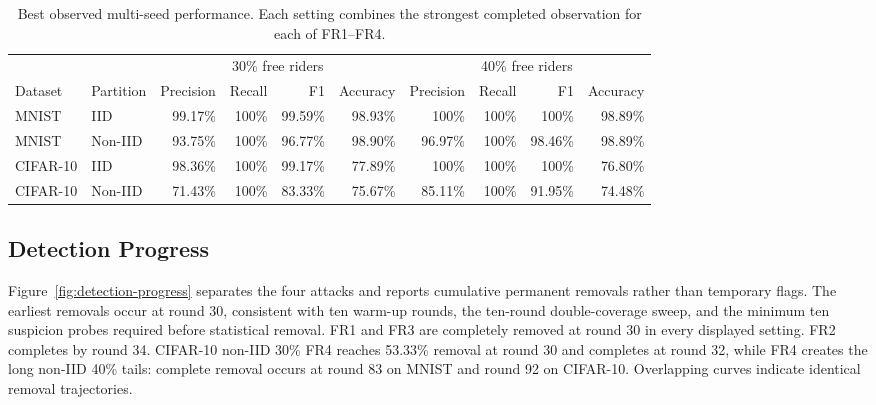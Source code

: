\documentclass[conference]{IEEEtran}
\begin{document}
\begin{table}[t]
\centering
\caption{Best observed multi-seed performance. Each setting combines the strongest completed observation for each of FR1--FR4.}
\label{tab:aggregate}
\setlength{\tabcolsep}{3.5pt}
\begin{tabular}{llrrrrrrrr}
\toprule
& & \multicolumn{4}{c}{30\% free riders} & \multicolumn{4}{c}{40\% free riders} \\
\cmidrule(lr){3-6}\cmidrule(lr){7-10}
Dataset & Partition & Precision & Recall & F1 & Accuracy & Precision & Recall & F1 & Accuracy \\
\midrule
MNIST & IID     & 99.17\% & 100\% & 99.59\% & 98.93\% & 100\%   & 100\% & 100\%   & 98.89\% \\
MNIST & Non-IID & 93.75\% & 100\% & 96.77\% & 98.90\% & 96.97\% & 100\% & 98.46\% & 98.89\% \\
CIFAR-10 & IID     & 98.36\% & 100\% & 99.17\% & 77.89\% & 100\%   & 100\% & 100\%   & 76.80\% \\
CIFAR-10 & Non-IID & 71.43\% & 100\% & 83.33\% & 75.67\% & 85.11\% & 100\% & 91.95\% & 74.48\% \\
\bottomrule
\end{tabular}
\end{table}

\subsection{Detection Progress}
Figure~\ref{fig:detection-progress} separates the four attacks and reports cumulative permanent removals rather than temporary flags. The earliest removals occur at round 30, consistent with ten warm-up rounds, the ten-round double-coverage sweep, and the minimum ten suspicion probes required before statistical removal. FR1 and FR3 are completely removed at round 30 in every displayed setting. FR2 completes by round 34. CIFAR-10 non-IID 30\% FR4 reaches 53.33\% removal at round 30 and completes at round 32, while FR4 creates the long non-IID 40\% tails: complete removal occurs at round 83 on MNIST and round 92 on CIFAR-10. Overlapping curves indicate identical removal trajectories.
\end{document}
